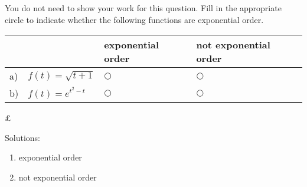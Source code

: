 \ifnum {}
\newpage
\question[1] You do not need to show your work for this question. Fill in the appropriate circle to indicate whether the following functions are exponential order. 
\vspace{-0.4cm}
\setlength{\extrarowheight}{0.20cm}
\begin{center}
\hspace{-.9cm}\begin{tabular}{ p{0.20cm} p{4cm} p{3.5cm} p{4cm} }
    & & exponential order &  not exponential order  \\[2pt] \hline 
    a) & $f(t) = \sqrt{t+1}$ & $\bigcirc$  & $\bigcirc$ \\[8pt]  
    b) & $f(t) = e^{t^2-t}$  & $\bigcirc$  & $\bigcirc$ \\[8pt] 
    \hline
\end{tabular}
\end{center}£
\setlength{\extrarowheight}{0.0cm}
\ifnum {} {\color{DarkBlue} Solutions: 
\begin{enumerate}[label=(\alph*)]
    \item exponential order 
    \item not exponential order
\end{enumerate}
}
\fi
\vspace{-6pt} 
\fi 
